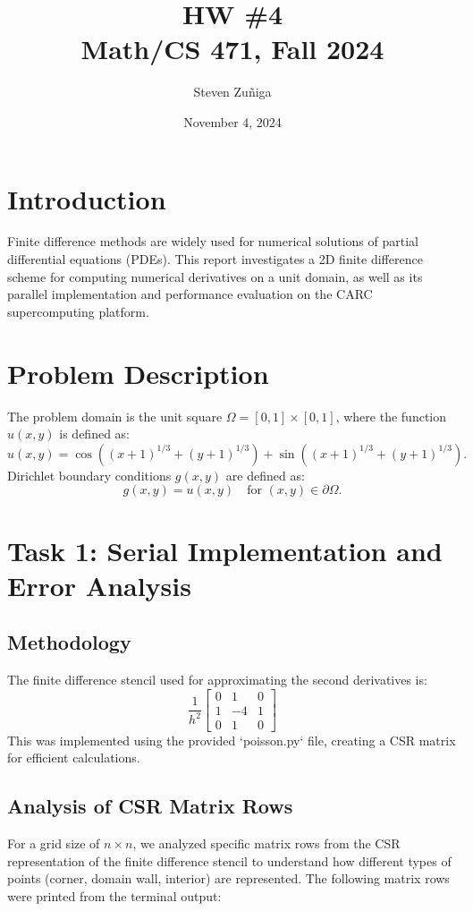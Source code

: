 \documentclass[12pt]{article}
\title{HW \#4 \\ Math/CS 471, Fall 2024}
\author{Steven Zuñiga}
\date{November 4, 2024}
\begin{document}
\maketitle
\newpage

\section{Introduction}
Finite difference methods are widely used for numerical solutions of partial differential equations (PDEs). This report investigates a 2D finite difference scheme for computing numerical derivatives on a unit domain, as well as its parallel implementation and performance evaluation on the CARC supercomputing platform.

\section{Problem Description}
The problem domain is the unit square \(\Omega = [0, 1] \times [0, 1]\), where the function \(u(x, y)\) is defined as:
\[
u(x, y) = \cos((x+1)^{1/3} + (y+1)^{1/3}) + \sin((x+1)^{1/3} + (y+1)^{1/3}).
\]
Dirichlet boundary conditions \(g(x, y)\) are defined as:
\[
g(x, y) = u(x, y) \quad \text{for } (x, y) \in \partial \Omega.
\]

\section{Task 1: Serial Implementation and Error Analysis}
\subsection{Methodology}
The finite difference stencil used for approximating the second derivatives is:
\[
\frac{1}{h^2} \begin{bmatrix} 0 & 1 & 0 \\ 1 & -4 & 1 \\ 0 & 1 & 0 \end{bmatrix}
\]
This was implemented using the provided `poisson.py` file, creating a CSR matrix for efficient calculations.

\subsection{Analysis of CSR Matrix Rows}
For a grid size of \( n \times n \), we analyzed specific matrix rows from the CSR representation of the finite difference stencil to understand how different types of points (corner, domain wall, interior) are represented. The following matrix rows were printed from the terminal output:
\end{document}
